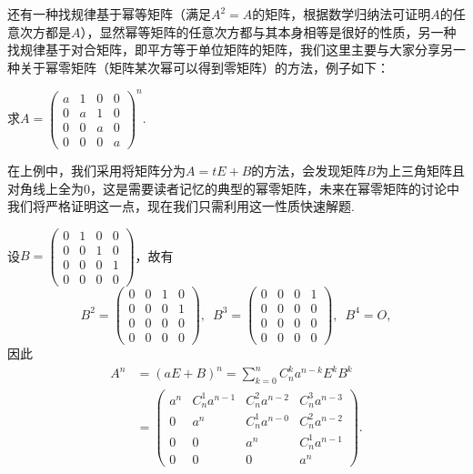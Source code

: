 \begin{enumerate}
          还有一种找规律基于幂等矩阵（满足$A^2=A$的矩阵，根据数学归纳法可证明$A$的任意次方都是$A$），显然幂等矩阵的任意次方都与其本身相等是很好的性质，另一种找规律基于对合矩阵，即平方等于单位矩阵的矩阵，我们这里主要与大家分享另一种关于幂零矩阵（矩阵某次幂可以得到零矩阵）的方法，例子如下：
          \begin{example}
              求$A=\begin{pmatrix}a & 1 & 0 & 0 \\ 0 & a & 1 & 0 \\ 0 & 0 & a & 0 \\ 0 & 0 & 0 & a \end{pmatrix}^n$.
          \end{example}
          在上例中，我们采用将矩阵分为$A=tE+B$的方法，会发现矩阵$B$为上三角矩阵且对角线上全为0，这是需要读者记忆的典型的幂零矩阵，未来在幂零矩阵的讨论中我们将严格证明这一点，现在我们只需利用这一性质快速解题.

          \begin{solution}
            设$B=\begin{pmatrix}
                0 & 1 & 0 & 0 \\ 0 & 0 & 1 & 0 \\ 0 & 0 & 0 & 1 \\ 0 & 0 & 0 & 0
            \end{pmatrix}$，故有
            \[B^2=\begin{pmatrix}
                0 & 0 & 1 & 0 \\ 0 & 0 & 0 & 1 \\ 0 & 0 & 0 & 0 \\ 0 & 0 & 0 & 0
            \end{pmatrix},\enspace B^3=\begin{pmatrix}
                0 & 0 & 0 & 1 \\ 0 & 0 & 0 & 0 \\ 0 & 0 & 0 & 0 \\ 0 & 0 & 0 & 0
            \end{pmatrix},\enspace B^4=O,\]
            因此
            \begin{align*}
                A^n&=(aE+B)^n=\sum\limits_{k=0}^nC_n^ka^{n-k}E^kB^k \\
                &=\begin{pmatrix}
                    a^n & C_n^1a^{n-1} & C_n^2a^{n-2} & C_n^3a^{n-3} \\ 0 & a^n & C_n^1a^{n-0} & C_n^2a^{n-2} \\ 0 & 0 & a^n & C_n^1a^{n-1} \\ 0 & 0 & 0 & a^n
                \end{pmatrix}.
            \end{align*}
          \end{solution}


\end{enumerate}
